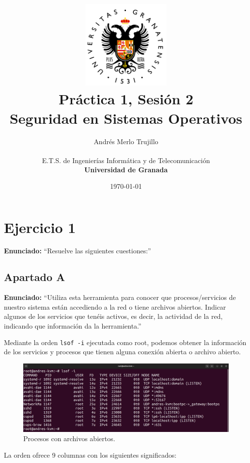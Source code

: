 \documentclass{article}
\title{
\includegraphics[width=1.75in]{imagenes/UGR-Logo.png} \\
\vspace*{1in}
\textbf{Práctica 1, Sesión 2} \\
Seguridad en Sistemas Operativos \\
\vspace*{0.5in}}
\author{Andrés Merlo Trujillo \\
\vspace*{0.5in} \\
E.T.S. de Ingenierías Informática y de Telecomunicación \\
\textbf{Universidad de Granada}} \date{\today}
\begin{document}
\begin{titlingpage}
    \maketitle
\end{titlingpage}

\tableofcontents

\newpage

\pagestyle{fancy}

\newpage
\section{Ejercicio 1}

\textbf{Enunciado: }``Resuelve las siguientes cuestiones:''

\subsection{Apartado A}

\textbf{Enunciado: }``Utiliza esta herramienta para conocer que procesos/servicios de nuestro sistema están accediendo a la red o tiene archivos abiertos. Indicar algunos de los servicios que tenéis activos, es decir, la actividad de la red, indicando que información da la herramienta.''

\bigskip

Mediante la orden \verb|lsof -i| ejecutada como root, podemos obtener la información de los servicios y procesos que tienen alguna conexión abierta o archivo abierto.

\begin{figure}[H]
    \includegraphics[width=\textwidth]{imagenes/lsofi.png}
    \caption{Procesos con archivos abiertos.}
\end{figure}

\bigskip

La orden ofrece 9 columnas con los siguientes significados:
\end{document}
